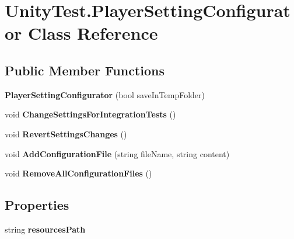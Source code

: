 \hypertarget{class_unity_test_1_1_player_setting_configurator}{}\section{Unity\+Test.\+Player\+Setting\+Configurator Class Reference}
\label{class_unity_test_1_1_player_setting_configurator}
\subsection*{Public Member Functions}
\begin{DoxyCompactItemize}
\item 
\mbox{\label{class_unity_test_1_1_player_setting_configurator_a4e5679de4e87a649a1d65dddd85ef580}} 
{\bfseries Player\+Setting\+Configurator} (bool save\+In\+Temp\+Folder)
\item 
\mbox{\label{class_unity_test_1_1_player_setting_configurator_a70cd9f0350952685ded79784a8328a14}} 
void {\bfseries Change\+Settings\+For\+Integration\+Tests} ()
\item 
\mbox{\label{class_unity_test_1_1_player_setting_configurator_ab16123525fdb102806ff227f0e5b1db8}} 
void {\bfseries Revert\+Settings\+Changes} ()
\item 
\mbox{\label{class_unity_test_1_1_player_setting_configurator_ac23dcf51fb70b0434686ce8949cd7e35}} 
void {\bfseries Add\+Configuration\+File} (string file\+Name, string content)
\item 
\mbox{\label{class_unity_test_1_1_player_setting_configurator_a6bf3f9be71c96bc838ef0447a03ff19a}} 
void {\bfseries Remove\+All\+Configuration\+Files} ()
\end{DoxyCompactItemize}
\subsection*{Properties}
\begin{DoxyCompactItemize}
\item 
\mbox{\label{class_unity_test_1_1_player_setting_configurator_a3112b9c543b83012fccf79421e2a52e1}} 
string {\bfseries resources\+Path}
\end{DoxyCompactItemize}
